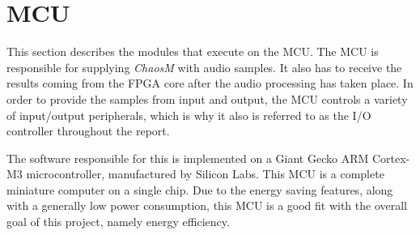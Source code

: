 
\clearpage
\section{MCU} \label{section:mcu}

This section describes the modules that execute on the MCU. The MCU is
responsible for supplying \textit{ChaosM} with audio samples. It also has to
receive the results coming from the FPGA core after the audio processing has
taken place. In order to provide the samples from input and output, the MCU
controls a variety of input/output peripherals, which is why it also is referred to as the I/O controller throughout the report.

The software responsible for this is implemented on a Giant Gecko ARM Cortex-M3
microcontroller, manufactured by Silicon Labs. This MCU is a complete miniature
computer on a single chip. Due to the energy saving features, along with a
generally low power consumption, this MCU is a good fit with the overall goal
of this project, namely energy efficiency.







